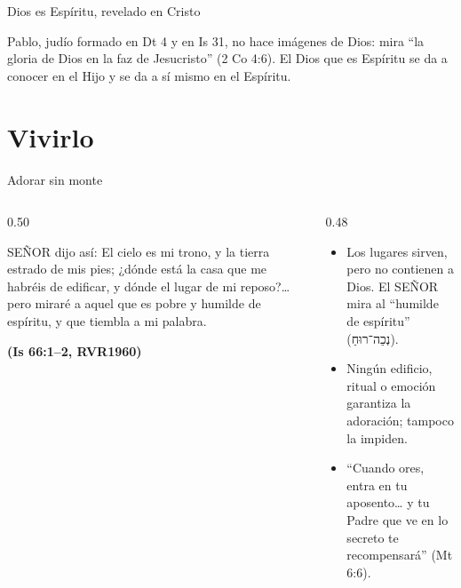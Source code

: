 \documentclass[hyperref={bookmarks=false},aspectratio=169]{beamer}
\newcommand{\heb}[1]{\mbox{\foreignlanguage{hebrew}{#1}}}
\newcommand{\SENOR}{S{\fontsize{0.78em}{1em}\selectfont EÑOR}}
\newcommand{\fuente}[1]{\par\hfill{\upshape\bfseries\footnotesize\textcolor{azul}{#1}}}
\begin{document}
\begin{frame}{Dios es Espíritu, revelado en Cristo}
\centering
{}\par\medskip
\small\RaggedRight Pablo, judío formado en Dt 4 y en Is 31, no hace imágenes de Dios: mira ``la gloria de Dios en la faz de Jesucristo'' (2 Co 4:6). El Dios que es Espíritu se da a conocer en el Hijo y se da a sí mismo en el Espíritu.
\end{frame}

\section{Vivirlo}

\begin{frame}{Adorar sin monte}
\begin{columns}[t,onlytextwidth]
\begin{column}{0.50\textwidth}
\begin{cita}\SENOR{} dijo así: El cielo es mi trono, y la tierra estrado de mis pies; ¿dónde está la casa que me habréis de edificar, y dónde el lugar de mi reposo?\ldots{} pero miraré a aquel que es pobre y humilde de espíritu, y que tiembla a mi palabra.\fuente{(Is 66:1--2, RVR1960)}\end{cita}
\end{column}
\begin{column}{0.48\textwidth}\small
\begin{itemize}
\item Los lugares sirven, pero no contienen a Dios. El \SENOR{} mira al ``humilde de espíritu'' (\heb{נְכֵה־רוּחַ}).
\item Ningún edificio, ritual o emoción garantiza la adoración; tampoco la impiden.
\item ``Cuando ores, entra en tu aposento\ldots{} y tu Padre que ve en lo secreto te recompensará'' (Mt 6:6).
\end{itemize}
\end{column}
\end{columns}
\end{frame}
\end{document}

